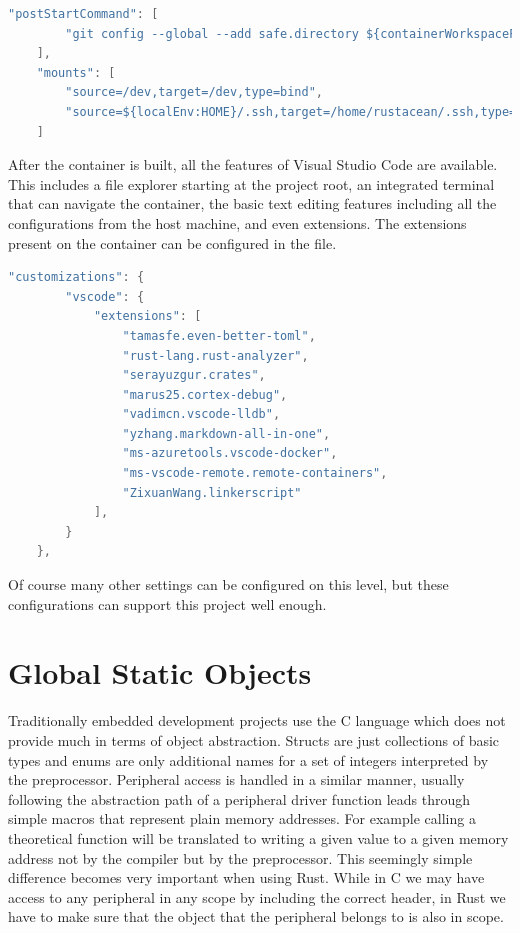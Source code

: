 \begin{lstlisting}[language=C,frame=single,float=!ht,label={lst:devcont-posttart},caption={Post Start Commands and Mounts}]
	"postStartCommand": [
		"git config --global --add safe.directory ${containerWorkspaceFolder}"
	],
    "mounts": [
		"source=/dev,target=/dev,type=bind",
		"source=${localEnv:HOME}/.ssh,target=/home/rustacean/.ssh,type=bind,consistency=cached"
	]
\end{lstlisting}


After the container is built, all the features of Visual Studio Code are available. This includes a file explorer starting at the project root, an integrated terminal that can navigate the container, the basic text editing features including all the configurations from the host machine, and even extensions. The extensions present on the container can be configured in the  file.

\begin{lstlisting}[language=C,frame=single,float=!ht,label={lst:devcont-ext},caption={List of VSCode Extensions in the Container}]
    "customizations": {
        "vscode": {
            "extensions": [
                "tamasfe.even-better-toml",
                "rust-lang.rust-analyzer",
                "serayuzgur.crates",
                "marus25.cortex-debug",
                "vadimcn.vscode-lldb",
                "yzhang.markdown-all-in-one",
				"ms-azuretools.vscode-docker",
				"ms-vscode-remote.remote-containers",
				"ZixuanWang.linkerscript"
            ],
        }
    },
\end{lstlisting}

Of course many other settings can be configured on this level, but these configurations can support this project well enough.

\section{Global Static Objects}

Traditionally embedded development projects use the C language which does not provide much in terms of object abstraction. Structs are just collections of basic types and enums are only additional names for a set of integers interpreted by the preprocessor. Peripheral access is handled in a similar manner, usually following the abstraction path of a peripheral driver function leads through simple macros that represent plain memory addresses. For example calling a theoretical function  will be translated to writing a given value to a given memory address not by the compiler but by the preprocessor. This seemingly simple difference becomes very important when using Rust. While in C we may have access to any peripheral in any scope by including the correct header, in Rust we have to make sure that the object that the peripheral belongs to is also in scope.

